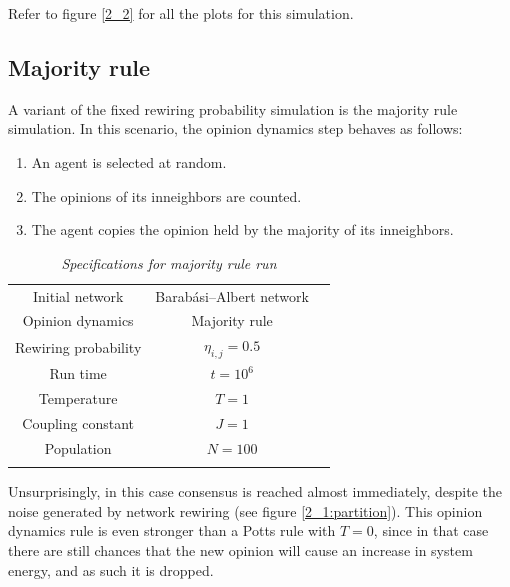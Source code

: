 \documentclass[12pt,openright,twoside]{book}
\begin{document}
Refer to figure \ref{2_2} for all the plots for this simulation.

\subsection{Majority rule}

A variant of the fixed rewiring probability simulation is the majority rule simulation. In this scenario, the opinion dynamics step behaves as follows:\\

\begin{enumerate}
    \item An agent is selected at random.
    \item The opinions of its inneighbors are counted.
    \item The agent copies the opinion held by the majority of its inneighbors.
\end{enumerate}

\vspace{14pt}

\begin{table}[!ht]
\centering
\begin{small}
\caption{\textit{Specifications for majority rule run}}
\begin{tabular}{ccc}
\hline
Initial network             & Barabási–Albert network\\
Opinion dynamics            & Majority rule \\
Rewiring probability        & $\eta_{i,j}=0.5$\\
Run time                    & $t=10^6$\\
Temperature                 & $T=1$ \\
Coupling constant           & $J=1$ \\
Population                  & $N=100$\\
\hline
\label{majority-rule-specs}
\end{tabular}
\end{small}
\end{table}




Unsurprisingly, in this case consensus is reached almost immediately, despite the noise generated by network rewiring (see figure \ref{2_1:partition}). This opinion dynamics rule is even stronger than a Potts rule with $T=0$, since in that case there are still chances that the new opinion will cause an increase in system energy, and as such it is dropped.\\
\end{document}
